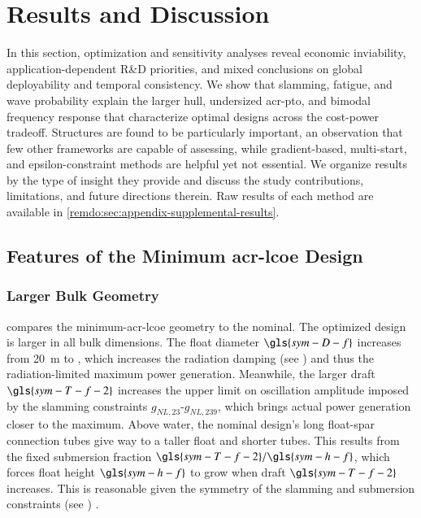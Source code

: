\section{Results and Discussion}\label{remdo:sec:results}
In this section, optimization and sensitivity analyses reveal
economic inviability, application-dependent R\&D priorities,
and mixed conclusions on global deployability and temporal consistency.
We show that slamming, fatigue, and wave probability explain the larger hull, undersized \gls{acr-pto}, and bimodal frequency response that characterize optimal designs across the cost-power tradeoff.
Structures are found to be particularly important, an observation that few other frameworks are capable of assessing,
while gradient-based, multi-start, and epsilon-constraint methods are helpful yet not essential.
We organize results by the type of insight they provide and discuss the study contributions, limitations, and future directions therein.
Raw results of each method are available in \cref{remdo:sec:appendix-supplemental-results}.

\subsection{Features of the Minimum \gls{acr-lcoe} Design}
\label{remdo:sec:results-single}

\subsubsection{Larger Bulk Geometry}
 compares the minimum-\gls{acr-lcoe} geometry to the nominal.
The optimized design is larger in all bulk dimensions.
The float diameter $\gls{sym-D-f}$ increases from 20~m to \resultsRE[DfoptMinLCOE],
which increases the radiation damping (see )
and thus the radiation-limited maximum power generation.
Meanwhile, the larger draft $\gls{sym-T-f-2}$ increases the upper limit on oscillation amplitude imposed by the slamming constraints $g_{NL,23}$-$g_{NL,239}$, which brings actual power generation closer to the maximum.
Above water, the nominal design's long float-spar connection tubes give way to a taller float and shorter tubes.
This results from the fixed submersion fraction $\gls{sym-T-f-2}/\gls{sym-h-f}$, which forces float height $\gls{sym-h-f}$ to grow when draft $\gls{sym-T-f-2}$ increases.
This is reasonable given the symmetry of the slamming and submersion constraints
\ifdefined\DISSERTATION
    (see )
\fi
.

